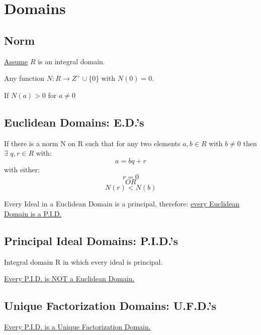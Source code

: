 \chapter{Domains}
\section{Norm}
\underline{Assume} $R$ is an integral domain.
\begin{defn}[Norm]
	Any function $N: R \to {Z}^{+} \cup \{0\}$ with $N(0) = 0$.
\end{defn}
\begin{defn}
	If $N(a) > 0$ for $a \not = 0$
\end{defn}
\section{Euclidean Domains: E.D.'s}
\begin{defn}
	If there is a norm N on R such that for any two elements $a, b \in R$ with $b \not = 0$ then $\exists$ $q, r \in R$ with:
	\[a = bq + r\]
	with either:
	\[r = 0\]
	\[OR\]
	\[N(r) < N(b)\]
\end{defn}
Every Ideal in a Euclidean Domain is a principal, therefore:
\underline{ every Euclidean Domain is a P.I.D.}

\section{Principal Ideal Domains: P.I.D.'s}
\begin{defn}[P.I.D.]
	Integral domain R in which every ideal is principal.
\end{defn}
\underline{Every P.I.D. is NOT a Euclidean Domain.}

\section{Unique Factorization Domains: U.F.D.'s}
\underline{Every P.I.D. is a Unique Factorization Domain.}
